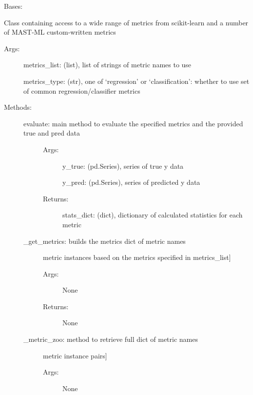 \documentclass[letterpaper,10pt,english]{sphinxmanual}
\begin{document}
\begin{fulllineitems}
\label{\detokenize{api/mastml.metrics.Metrics:mastml.metrics.Metrics}}
Bases: 

Class containing access to a wide range of metrics from scikit-learn and a number of MAST-ML custom-written metrics
\begin{description}
\item[{Args:}] \leavevmode
metrics\_list: (list), list of strings of metric names to use

metrics\_type: (str), one of ‘regression’ or ‘classification’: whether to use set of common regression/classifier metrics

\item[{Methods:}] \leavevmode\begin{description}
\item[{evaluate: main method to evaluate the specified metrics and the provided true and pred data}] \leavevmode\begin{description}
\item[{Args:}] \leavevmode
y\_true: (pd.Series), series of true y data

y\_pred: (pd.Series), series of predicted y data

\item[{Returns:}] \leavevmode
stats\_dict: (dict), dictionary of calculated statistics for each metric

\end{description}

\item[{\_get\_metrics: builds the metrics dict of metric names}] \leavevmode{[}metric instances based on the metrics specified in metrics\_list{]}\begin{description}
\item[{Args:}] \leavevmode
None

\item[{Returns:}] \leavevmode
None

\end{description}

\item[{\_metric\_zoo: method to retrieve full dict of metric names}] \leavevmode{[}metric instance pairs{]}\begin{description}
\item[{Args:}] \leavevmode
None


\end{description}
\end{description}
\end{description}
\end{fulllineitems}
\end{document}
